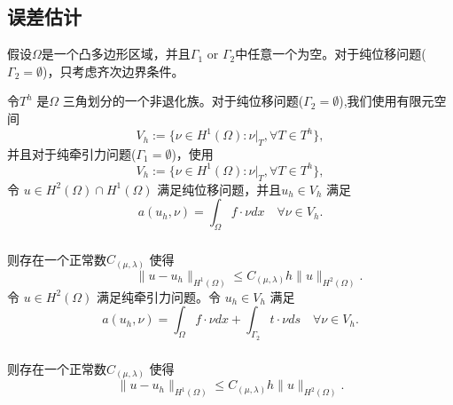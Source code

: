 \documentclass[a4paper,UTF8,titlepage]{ctexart}
\begin{document}
\subsection{误差估计}

假设$\Omega$是一个凸多边形区域，并且$\Gamma_1$ or $\Gamma_2$中任意一个为空。对于纯位移问题($\Gamma_2=\emptyset$)，只考虑齐次边界条件。
\par
令$T^h$ 是$\Omega$ 三角划分的一个非退化族。对于纯位移问题($\Gamma_2=\emptyset$),我们使用有限元空间
$$
V_h := \{ \nu \in H^1(\Omega) : \nu |_{T} , \forall T \in T^h \},
$$
并且对于纯牵引力问题($\Gamma_1 = \emptyset$)，使用
	$$
	V_h := \{ \nu \in H^1(\Omega) : \nu |_{T} , \forall T \in T^h \},
	$$
	令 $u \in H^2(\Omega) \cap H^1(\Omega)$ 满足纯位移问题，并且$u_h \in V_h$ 满足
	\begin{equation}
	a(u_h, \nu) = \int_{\Omega} f \cdot \nu dx \quad \forall \nu \in V_h.
	\end{equation}
	\\
	则存在一个正常数$C_{(\mu, \lambda)}$ 使得\textsuperscript{\cite{brenner2008mathematical}}
	\begin{equation}
	\quad \quad \quad
	\| u - u_h \|_{H^1(\Omega)} \le C_{(\mu, \lambda)} h \| u \|_{H^2(\Omega)}.
	\end{equation}
	令 $u \in H^2(\Omega)$ 满足纯牵引力问题。令 $u_h \in V_h$ 满足
	\begin{equation}
	a(u_h,\nu) = \int_{\Omega} f \cdot \nu dx + \int_{\Gamma_2} t \cdot \nu ds \quad \forall \nu \in V_h.
	\end{equation}
	\\
	则存在一个正常数$C_{(\mu, \lambda)}$ 使得\textsuperscript{\cite{brenner2008mathematical}}
	\begin{equation}
	\| u - u_h \|_{H^1(\Omega)} \le C_{(\mu, \lambda)} h \| u \|_{H^2(\Omega)}.
	\end{equation}
\end{document}
